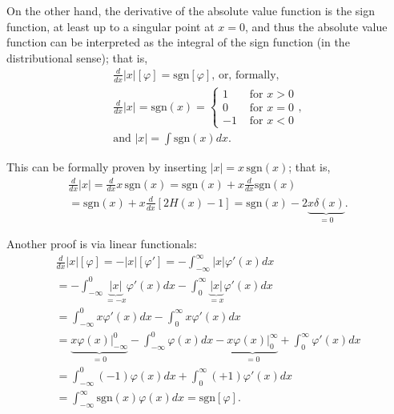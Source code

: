 On the other hand, the derivative of the absolute value function is the sign function, at least up to a singular point at $x=0$,
and thus the absolute value function can be interpreted as the integral of the sign function (in the distributional sense);
that is,
\begin{equation}
\begin{split}
\frac{d}{dx} \left|x\right| \left[ \varphi \right]
=
\textrm{sgn}\left[ \varphi \right] \text{, or, formally,}
\\
\frac{d }{dx} \left|x\right|
=
\textrm{sgn} (x)
=
\left\{
\begin{array}{rl}
1&\textrm{ for } x > 0\\
0&\textrm{ for } x = 0\\
-1&\textrm{ for } x < 0
\end{array}
\right.
,\\
\text{and } \left|x\right| =  \int \textrm{sgn} (x) dx.
\end{split}
 \end{equation}

{\color{OliveGreen}
\bproof
This can  be formally proven by inserting
$\left|x\right|  =  {x}\, \textrm{sgn} (x)$; that is,
\begin{equation}
\begin{split}
\frac{d }{dx}  \left|x\right|
=
\frac{d }{dx}x\,\textrm{sgn} (x)
=
\textrm{sgn} (x)  + x\frac{d}{dx} \textrm{sgn} (x)
\\
=
\textrm{sgn} (x)  + x\frac{d }{dx}\left[2H(x)-1\right]
=
\textrm{sgn} (x) - 2\underbrace{x\delta(x)}_{=0}.
\end{split}
 \end{equation}

Another proof is via linear functionals:
\begin{equation}
\begin{split}
\frac{d }{dx}  \left|x\right|   \left[ \varphi \right]
= -  \left|x\right|   \left[ \varphi' \right]
= -\int_{-\infty}^\infty  \left|x\right|   \varphi'  (x) dx
\\
= -\int_{-\infty}^0 \underbrace{\left|x\right|}_{=-x}   \varphi'  (x) dx
- \int_{0}^\infty  \underbrace{\left|x\right|}_{=x}    \varphi'  (x) dx
\\
= \int_{-\infty}^0  x    \varphi'  (x) dx - \int_{0}^\infty   x    \varphi'  (x) dx
\\
= \underbrace{\left. x \varphi   (x)\right|_{-\infty}^0}_{=0}  -  \int_{-\infty}^0    \varphi   (x) dx  -  \underbrace{\left. x \varphi   (x)\right|_0^{\infty}}_{=0}  + \int_{0}^\infty        \varphi'  (x) dx
\\
=   \int_{-\infty}^0    (-1) \varphi   (x) dx      + \int_{0}^\infty  (+1)    \varphi'  (x) dx  \\
=   \int_{-\infty}^\infty     \textrm{sgn}(x) \varphi   (x) dx
= \textrm{sgn}\left[ \varphi \right]
.
\end{split}
 \end{equation}


\eproof
}



